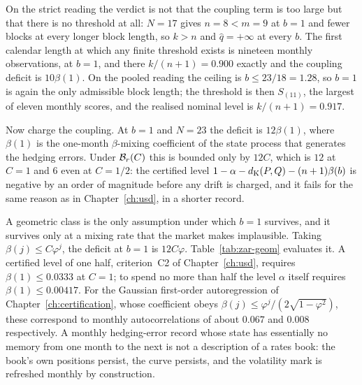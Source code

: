 \documentclass[../../../main.tex]{subfiles}
\begin{document}
On the strict reading the verdict is not that the coupling term is too large but that there is no threshold at all: $N=17$ gives $n=8<m=9$ at $b=1$ and fewer blocks at every longer block length, so $k>n$ and $\hat q=+\infty$ at every $b$. The first calendar length at which any finite threshold exists is nineteen monthly observations, at $b=1$, and there $k/(n+1)=0.900$ exactly and the coupling deficit is $10\beta(1)$. On the pooled reading the ceiling is $b\le23/18=1.28$, so $b=1$ is again the only admissible block length; the threshold is then $S_{(11)}$, the largest of eleven monthly scores, and the realised nominal level is $k/(n+1)=0.917$.

Now charge the coupling. At $b=1$ and $N=23$ the deficit is $12\beta(1)$, where $\beta(1)$ is the one-month $\beta$-mixing coefficient of the state process that generates the hedging errors. Under $\mathcal B_{r}(C)$ this is bounded only by $12C$, which is $12$ at $C=1$ and $6$ even at $C=1/2$: the certified level $1-\alpha-d_{\mathrm{K}}(P,Q)-(n+1)\beta(b)$ is negative by an order of magnitude before any drift is charged, and it fails for the same reason as in Chapter~\ref{ch:usd}, in a shorter record.

A geometric class is the only assumption under which $b=1$ survives, and it survives only at a mixing rate that the market makes implausible. Taking $\beta(j)\le C\varphi^{j}$, the deficit at $b=1$ is $12C\varphi$. Table~\ref{tab:zar-geom} evaluates it. A certified level of one half, criterion~C2 of Chapter~\ref{ch:usd}, requires $\beta(1)\le0.0333$ at $C=1$; to spend no more than half the level $\alpha$ itself requires $\beta(1)\le0.00417$. For the Gaussian first-order autoregression of Chapter~\ref{ch:certification}, whose coefficient obeys $\beta(j)\le\varphi^{j}/(2\sqrt{1-\varphi^2})$, these correspond to monthly autocorrelations of about $0.067$ and $0.008$ respectively. A monthly hedging-error record whose state has essentially no memory from one month to the next is not a description of a rates book: the book's own positions persist, the curve persists, and the volatility mark is refreshed monthly by construction.
\end{document}
